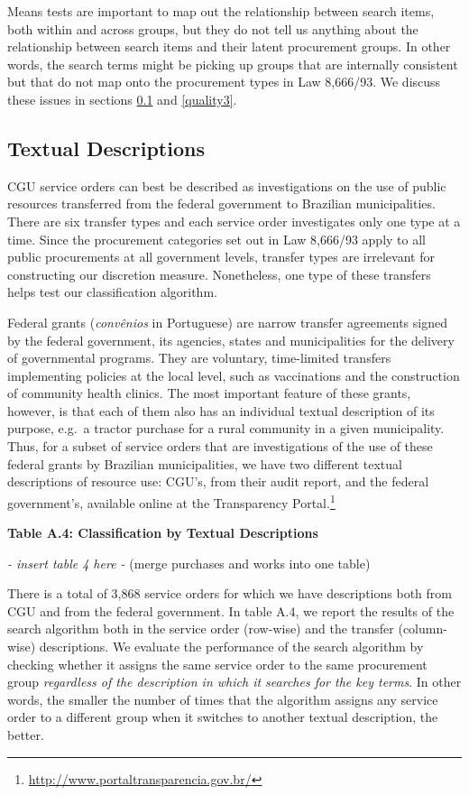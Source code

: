 \documentclass[]{article}
\let\rmarkdownfootnote\footnote%
\def\footnote{\protect\rmarkdownfootnote}
\theoremstyle{definition}
\theoremstyle{definition}
\theoremstyle{definition}
\theoremstyle{remark}
\begin{document}
Means tests are important to map out the relationship between search
items, both within and across groups, but they do not tell us anything
about the relationship between search items and their latent procurement
groups. In other words, the search terms might be picking up groups that
are internally consistent but that do not map onto the procurement types
in Law 8,666/93. We discuss these issues in sections \ref{quality2} and
\ref{quality3}.

\hypertarget{quality2}{%
\subsection{Textual Descriptions}\label{quality2}}

CGU service orders can best be described as investigations on the use of
public resources transferred from the federal government to Brazilian
municipalities. There are six transfer types and each service order
investigates only one type at a time. Since the procurement categories
set out in Law 8,666/93 apply to all public procurements at all
government levels, transfer types are irrelevant for constructing our
discretion measure. Nonetheless, one type of these transfers helps test
our classification algorithm.

Federal grants (\emph{convênios} in Portuguese) are narrow transfer
agreements signed by the federal government, its agencies, states and
municipalities for the delivery of governmental programs. They are
voluntary, time-limited transfers implementing policies at the local
level, such as vaccinations and the construction of community health
clinics. The most important feature of these grants, however, is that
each of them also has an individual textual description of its purpose,
e.g.~a tractor purchase for a rural community in a given municipality.
Thus, for a subset of service orders that are investigations of the use
of these federal grants by Brazilian municipalities, we have two
different textual descriptions of resource use: CGU's, from their audit
report, and the federal government's, available online at the
Transparency Portal.\footnote{\url{http://www.portaltransparencia.gov.br/}}

\textbf{Table A.4: Classification by Textual Descriptions}

\emph{- insert table 4 here -} (merge purchases and works into one
table)

There is a total of 3,868 service orders for which we have descriptions
both from CGU and from the federal government. In table A.4, we report
the results of the search algorithm both in the service order (row-wise)
and the transfer (column-wise) descriptions. We evaluate the performance
of the search algorithm by checking whether it assigns the same service
order to the same procurement group \emph{regardless of the description
in which it searches for the key terms}. In other words, the smaller the
number of times that the algorithm assigns any service order to a
different group when it switches to another textual description, the
better.
\end{document}
